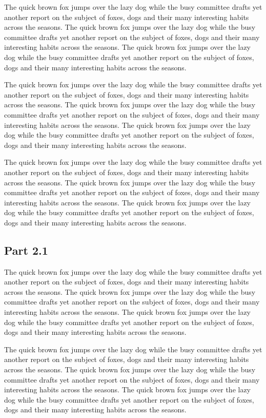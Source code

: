 \documentclass{article}
\begin{document}
The quick brown fox jumps over the lazy dog while the busy committee drafts yet another report on the subject of foxes, dogs and their many interesting habits across the seasons. The quick brown fox jumps over the lazy dog while the busy committee drafts yet another report on the subject of foxes, dogs and their many interesting habits across the seasons. The quick brown fox jumps over the lazy dog while the busy committee drafts yet another report on the subject of foxes, dogs and their many interesting habits across the seasons. 

The quick brown fox jumps over the lazy dog while the busy committee drafts yet another report on the subject of foxes, dogs and their many interesting habits across the seasons. The quick brown fox jumps over the lazy dog while the busy committee drafts yet another report on the subject of foxes, dogs and their many interesting habits across the seasons. The quick brown fox jumps over the lazy dog while the busy committee drafts yet another report on the subject of foxes, dogs and their many interesting habits across the seasons. 

The quick brown fox jumps over the lazy dog while the busy committee drafts yet another report on the subject of foxes, dogs and their many interesting habits across the seasons. The quick brown fox jumps over the lazy dog while the busy committee drafts yet another report on the subject of foxes, dogs and their many interesting habits across the seasons. The quick brown fox jumps over the lazy dog while the busy committee drafts yet another report on the subject of foxes, dogs and their many interesting habits across the seasons. 

\subsection{Part 2.1}
The quick brown fox jumps over the lazy dog while the busy committee drafts yet another report on the subject of foxes, dogs and their many interesting habits across the seasons. The quick brown fox jumps over the lazy dog while the busy committee drafts yet another report on the subject of foxes, dogs and their many interesting habits across the seasons. The quick brown fox jumps over the lazy dog while the busy committee drafts yet another report on the subject of foxes, dogs and their many interesting habits across the seasons. 

The quick brown fox jumps over the lazy dog while the busy committee drafts yet another report on the subject of foxes, dogs and their many interesting habits across the seasons. The quick brown fox jumps over the lazy dog while the busy committee drafts yet another report on the subject of foxes, dogs and their many interesting habits across the seasons. The quick brown fox jumps over the lazy dog while the busy committee drafts yet another report on the subject of foxes, dogs and their many interesting habits across the seasons. 
\end{document}
